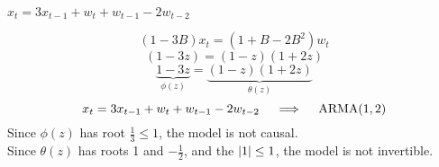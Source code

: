 $x_t = 3x_{t-1} + w_t + w_{t-1} - 2 w_{t-2}$

$$(1-3B)x_t = (1+B-2B^2)w_t$$
$$(1-3z) = (1-z)(1+2z)$$
$$\underbrace{1-3z}_{\phi(z)} = \underbrace{(1-z)(1+2z)}_{\theta(z)}$$
$$x_t = 3x_{t-1} + w_t + w_{t-1} - 2 w_{t-2} \quad \implies \quad \operatorname{ARMA}(1,2)$$
Since $\phi(z)$ has root $\frac{1}{3} \leq 1$, the model is not causal.\\
Since $\theta(z)$ has roots 1 and $-\frac12$, and the $\abs{1} \leq 1$, the model is not invertible.